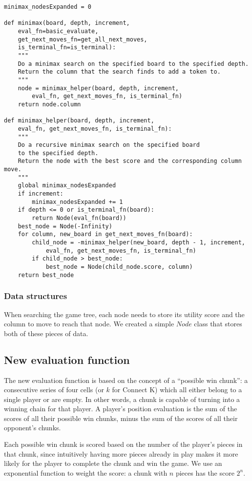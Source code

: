 \documentclass[11pt]{article}
\begin{document}
\lstset{language=Python}
\begin{lstlisting}[frame=single]
minimax_nodesExpanded = 0

def minimax(board, depth, increment,
	eval_fn=basic_evaluate,
	get_next_moves_fn=get_all_next_moves,
	is_terminal_fn=is_terminal):
	"""
	Do a minimax search on the specified board to the specified depth.
	Return the column that the search finds to add a token to.
	"""
	node = minimax_helper(board, depth, increment,
		eval_fn, get_next_moves_fn, is_terminal_fn)
	return node.column

def minimax_helper(board, depth, increment,
	eval_fn, get_next_moves_fn, is_terminal_fn):
	"""
	Do a recursive minimax search on the specified board
	to the specified depth.
	Return the node with the best score and the corresponding column move.
	"""
	global minimax_nodesExpanded
	if increment:
		minimax_nodesExpanded += 1
	if depth <= 0 or is_terminal_fn(board):
		return Node(eval_fn(board))
	best_node = Node(-Infinity)
	for column, new_board in get_next_moves_fn(board):
		child_node = -minimax_helper(new_board, depth - 1, increment,
			eval_fn, get_next_moves_fn, is_terminal_fn)
		if child_node > best_node:
			best_node = Node(child_node.score, column)
	return best_node
\end{lstlisting}

\subsubsection{Data structures}

When searching the game tree, each node needs to store its utility score and
the column to move to reach that node. We created a simple \(Node\) class that
stores both of these pieces of data.

\subsection{New evaluation function}

The new evaluation function is based on the concept of a ``possible win chunk'':
a consecutive series of four cells (or $k$ for Connect K) which all either belong
to a single player or are empty. In other words, a chunk is capable of turning
into a winning chain for that player. A player's position evaluation is the sum
of the scores of all their possible win chunks, minus the sum of the scores of
all their opponent's chunks.

Each possible win chunk is scored based on the number of the player's pieces in
that chunk, since intuitively having more pieces already in play makes it more
likely for the player to complete the chunk and win the game. We use an
exponential function to weight the score: a chunk with $n$ pieces has the score
$2^n$.
\end{document}
